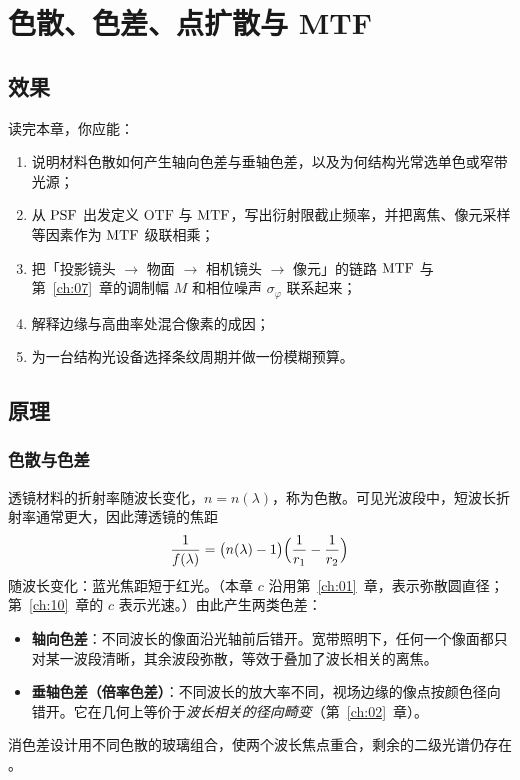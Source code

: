 \chapter{色散、色差、点扩散与 MTF}
\label{ch:09}

\section{效果}
\label{sec:ch08-effect}

读完本章，你应能：
\begin{enumerate}
  \item 说明材料色散如何产生轴向色差与垂轴色差，以及为何结构光常选单色或窄带光源；
  \item 从 $\mathrm{PSF}$ 出发定义 $\mathrm{OTF}$ 与 $\mathrm{MTF}$，写出衍射限截止频率，并把离焦、像元采样等因素作为 $\mathrm{MTF}$ 级联相乘；
  \item 把「投影镜头 $\to$ 物面 $\to$ 相机镜头 $\to$ 像元」的链路 $\mathrm{MTF}$ 与第~\ref{ch:07}~章的调制幅 $M$ 和相位噪声 $\sigma_\varphi$ 联系起来；
  \item 解释边缘与高曲率处混合像素的成因；
  \item 为一台结构光设备选择条纹周期并做一份模糊预算。
\end{enumerate}

\section{原理}
\label{sec:ch08-principle}

\subsection{色散与色差}

透镜材料的折射率随波长变化，$n=n(\lambda)$，称为色散。可见光波段中，短波长折射率通常更大，因此薄透镜的焦距
\[
  \frac{1}{f(\lambda)}=\bigl(n(\lambda)-1\bigr)\Bigl(\frac{1}{r_1}-\frac{1}{r_2}\Bigr)
\]
随波长变化：蓝光焦距短于红光。（本章 $c$ 沿用第~\ref{ch:01}~章，表示弥散圆直径；第~\ref{ch:10}~章的 $c$ 表示光速。）由此产生两类色差：
\begin{itemize}
  \item \textbf{轴向色差}：不同波长的像面沿光轴前后错开。宽带照明下，任何一个像面都只对某一波段清晰，其余波段弥散，等效于叠加了波长相关的离焦。
  \item \textbf{垂轴色差（倍率色差）}：不同波长的放大率不同，视场边缘的像点按颜色径向错开。它在几何上等价于\emph{波长相关的径向畸变}（第~\ref{ch:02}~章）。
\end{itemize}
消色差设计用不同色散的玻璃组合，使两个波长焦点重合，剩余的二级光谱仍存在 \citep{HechtOptics}。

